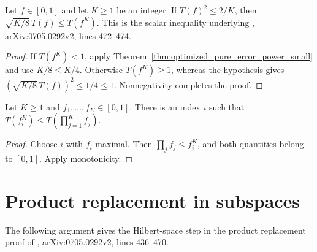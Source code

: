 \begin{theorem}
    \label{thm:optimized_pure_error_power}
    \leanok
    Let $f\in[0,1]$ and let $K\ge1$ be an integer. If $T(f)^2\le2/K$, then
    $\sqrt{K/8}\,T(f)\le T(f^K)$.
    This is the scalar inequality underlying
    \cite{Schuch2008Entropy}, arXiv:0705.0292v2, lines 472--474.
\end{theorem}
\begin{proof}\leanok
    If $T(f^K)<1$, apply Theorem~\ref{thm:optimized_pure_error_power_small}
    and use $K/8\le K/4$.
    Otherwise $T(f^K)\ge1$, whereas the hypothesis gives
    $(\sqrt{K/8}\,T(f))^2\le1/4\le1$.
    Nonnegativity completes the proof.
\end{proof}

\begin{corollary}
    \label{cor:optimized_pure_error_max_factor}
    \leanok
    Let $K\ge1$ and $f_1,\ldots,f_K\in[0,1]$. There is an index $i$ such that
    $T(f_i^K)\le T(\prod_{j=1}^K f_j)$.
\end{corollary}
\begin{proof}\leanok
    Choose $i$ with $f_i$ maximal. Then $\prod_j f_j\le f_i^K$,
    and both quantities belong to $[0,1]$. Apply monotonicity.
\end{proof}

\section{Product replacement in subspaces}

The following argument gives the Hilbert-space step in the product replacement
proof of \cite{Schuch2008Entropy}, arXiv:0705.0292v2, lines 436--470.

